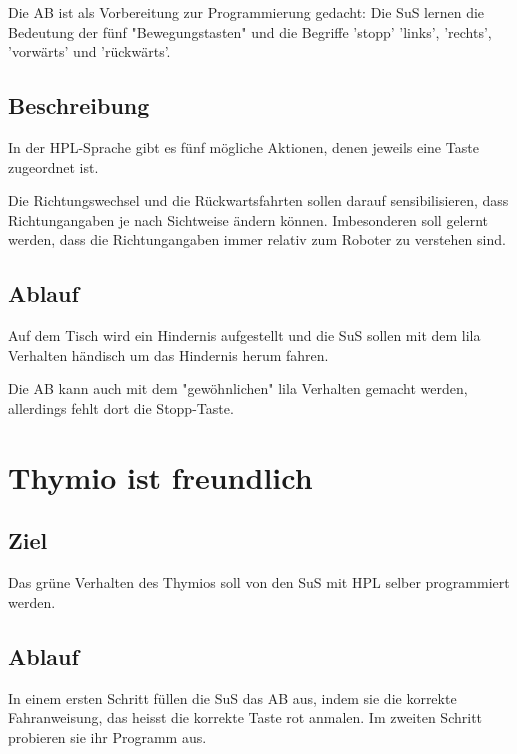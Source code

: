\documentclass[12pt]{article}
\begin{document}
Die AB ist als Vorbereitung zur Programmierung gedacht: Die SuS lernen die Bedeutung der fünf "Bewegungstasten" und die Begriffe 'stopp' 'links', 'rechts', 'vorwärts' und 'rückwärts'.

\subsection*{Beschreibung}

In der HPL-Sprache gibt es fünf mögliche Aktionen, denen jeweils eine Taste zugeordnet ist.

Die Richtungswechsel und die Rückwartsfahrten sollen darauf sensibilisieren, dass Richtungangaben je nach Sichtweise ändern können. Imbesonderen soll gelernt werden, dass die Richtungangaben immer relativ zum Roboter zu verstehen sind.

\subsection*{Ablauf}

Auf dem Tisch wird ein Hindernis aufgestellt und die SuS sollen mit dem lila Verhalten händisch um das Hindernis herum fahren. 

Die AB kann auch mit dem "gewöhnlichen" lila Verhalten gemacht werden, allerdings fehlt dort die Stopp-Taste.

\section*{Thymio ist freundlich}
\subsection*{Ziel}
Das grüne Verhalten des Thymios soll von den SuS mit HPL selber programmiert werden.




\subsection*{Ablauf}

In einem ersten Schritt füllen die SuS das AB aus, indem sie die korrekte Fahranweisung, das heisst die korrekte Taste rot anmalen. Im zweiten Schritt probieren sie ihr Programm aus.
\end{document}
